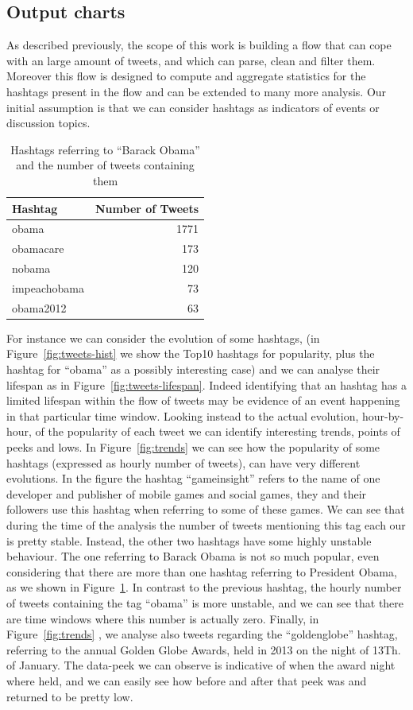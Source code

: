 \subsection{Output charts}
As described previously, the scope of this work is building a flow that can cope with an large amount of tweets, and which can parse, clean and filter them.
Moreover this flow is designed to compute and aggregate statistics for the hashtags present in the flow and can be extended  to many more analysis.
Our initial assumption is that we can consider hashtags as indicators of events or discussion topics.

\begin{table}[htb]
\centering 
\begin{tabular}{|l|r|}
\hline		
Hashtag			& Number of Tweets\\
\hline
obama		&	1771\\
obamacare		& 173\\
nobama 		& 120\\
impeachobama 		& 73\\  
obama2012 		& 63\\  
\hline
\end{tabular}
\caption{Hashtags referring to ``Barack Obama'' and the number of tweets containing them}
\label{tbl:obama-tweets}
\end{table}

For instance we can consider the evolution of some hashtags, (in Figure~\ref{fig:tweets-hist} we show the Top10 hashtags for popularity, plus the hashtag for ``obama'' as a possibly interesting case)  and we can analyse their lifespan as in Figure~\ref{fig:tweets-lifespan}.
Indeed identifying that an hashtag has a limited lifespan within the flow of tweets may be evidence of an event happening in that  particular time window.
Looking instead to the actual evolution, hour-by-hour, of the popularity of each tweet we can identify interesting trends, points of peeks and lows.
In Figure~\ref{fig:trends} we can see how the popularity of some hashtags (expressed as hourly number of tweets), can have very different evolutions.
In the figure the hashtag ``gameinsight'' refers to the name of one developer and publisher of mobile games and social games, they and their followers use this hashtag when referring to some of these games.
We can see that during the time of the analysis the number of tweets mentioning this tag each our is pretty stable.
Instead, the other two hashtags have some highly unstable behaviour.
The one referring to Barack Obama is not so much popular, even considering that there are more than one hashtag referring to President Obama, as we shown in Figure~\ref{tbl:obama-tweets}.
In contrast to the previous hashtag, the hourly number of tweets containing the tag ``obama'' is more unstable, and we can see that there are time windows where this number is actually zero.
Finally, in Figure~\ref{fig:trends} , we analyse also tweets regarding the ``goldenglobe'' hashtag, referring to the annual Golden Globe Awards, held in 2013 on the night of 13Th. of January.
The data-peek we can observe is indicative of when the award night where held, and we can easily see how before and after that peek was and returned to be pretty low.

